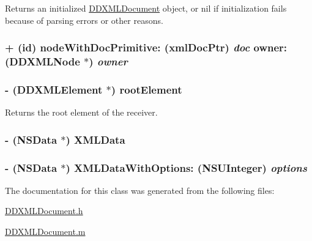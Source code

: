 Returns an initialized \hyperlink{interface_d_d_x_m_l_document}{DDXMLDocument} object, or nil if initialization fails because of parsing errors or other reasons. \hypertarget{interface_d_d_x_m_l_document_ab3dd88e49ab871b27b86ffd44e7aa8dc}{
\subsubsection[{nodeWithDocPrimitive:owner:}]{\setlength{\rightskip}{0pt plus 5cm}+ (id) nodeWithDocPrimitive: (xmlDocPtr) {\em doc}\/ owner: ({\bf DDXMLNode} $\ast$) {\em owner}}}
\label{interface_d_d_x_m_l_document_ab3dd88e49ab871b27b86ffd44e7aa8dc}
\hypertarget{interface_d_d_x_m_l_document_aa052cb6b8b74bd92daf337e32afa2747}{
\subsubsection[{rootElement}]{\setlength{\rightskip}{0pt plus 5cm}-\/ ({\bf DDXMLElement} $\ast$) rootElement }}
\label{interface_d_d_x_m_l_document_aa052cb6b8b74bd92daf337e32afa2747}
Returns the root element of the receiver. \hypertarget{interface_d_d_x_m_l_document_add299b33a482e3f3847eb8a3f7fa3f99}{
\subsubsection[{XMLData}]{\setlength{\rightskip}{0pt plus 5cm}-\/ (NSData $\ast$) XMLData }}
\label{interface_d_d_x_m_l_document_add299b33a482e3f3847eb8a3f7fa3f99}
\hypertarget{interface_d_d_x_m_l_document_ad9a33564e109fc0864e6e717160e6d1b}{
\subsubsection[{XMLDataWithOptions:}]{\setlength{\rightskip}{0pt plus 5cm}-\/ (NSData $\ast$) XMLDataWithOptions: (NSUInteger) {\em options}}}
\label{interface_d_d_x_m_l_document_ad9a33564e109fc0864e6e717160e6d1b}


The documentation for this class was generated from the following files:\begin{DoxyCompactItemize}
\item 
\hyperlink{_d_d_x_m_l_document_8h}{DDXMLDocument.h}\item 
\hyperlink{_d_d_x_m_l_document_8m}{DDXMLDocument.m}\end{DoxyCompactItemize}
